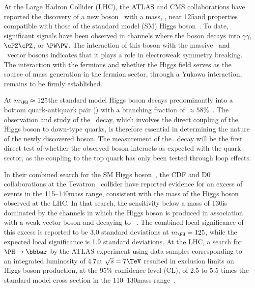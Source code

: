 \documentclass[11pt,twoside,a4paper,cmspaper,final,collab]{cms-tdr}
\begin{document}
At the Large Hadron Collider (LHC), the ATLAS and CMS collaborations have reported the
discovery of a new
boson~\cite{Chatrchyan:2012ufa,Aad:2012tfa} with a mass, \mH, near
125\GeV and properties compatible with those of the
standard model (SM) Higgs
boson~\cite{Englert:1964et,Higgs:1964ia,Higgs:1964pj,Guralnik:1964eu,Higgs:1966ev,Kibble:1967sv}. To
date, significant signals have been observed in
channels where the boson decays into $\gamma \gamma$, $\cPZ\cPZ$, or $\PW\PW$.
The interaction of this boson with the massive \PW\ and \cPZ\  vector
bosons indicates that it plays a role in electroweak symmetry
breaking. The interaction with the fermions and whether the Higgs
field serves as the source of mass generation in the fermion sector,
through a Yukawa interaction, remains to be firmly established.


At $\mH\approx 125$\GeV  the standard model Higgs boson decays
predominantly into a bottom quark-antiquark pair (\bbbar) with a
branching fraction of ${\approx}58\%$~\cite{Dittmaier:2011ti}. The
observation and study of the \HBB\ decay, which involves the direct
coupling of the Higgs boson to down-type quarks, is therefore
essential in determining the nature of the newly discovered boson.
The measurement of the \HBB\ decay  will be the first direct test of whether the
observed boson interacts as expected with the quark sector, as the
coupling to the top quark has only been tested through loop effects.

In their combined search for the SM Higgs boson~\cite{PhysRevD.88.052014},
the CDF and D0 collaborations at the Tevatron  \Pp\Pap\ collider have reported evidence for
an excess of events in the 115--140\GeV mass range, consistent with the mass of the Higgs boson observed at the LHC.
In that search, the sensitivity below a mass of 130\GeV is dominated by the channels in
which the Higgs boson is produced in association with a weak vector boson and decaying to
\bbbar~\cite{PhysRevLett.109.071804}. The combined local significance
  of this excess is reported to be 3.0 standard deviations at
  $\mH=125$\GeV, while the expected local significance is 1.9 standard deviations.  At the LHC, a search for $\PH\to \bbbar$ by the ATLAS
experiment using data samples corresponding to an integrated
luminosity of $4.7$\fbinv at $\sqrt{s}=7\TeV$ resulted in exclusion limits on Higgs boson
production, at the 95\% confidence level (CL), of 2.5 to 5.5 times the
standard model cross section in the 110--130\GeV mass range~\cite{Aad:2012gxa}.
\end{document}
